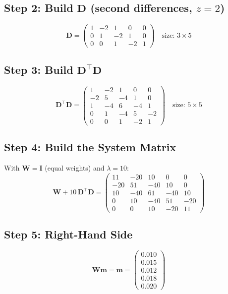 \documentclass[11pt,a4paper]{article}
\begin{document}
\subsection*{Step 2: Build $\bm{D}$ (second differences, $z=2$)}

\[
\bm{D} = \begin{pmatrix}
1 & -2 & 1 & 0 & 0 \\
0 & 1 & -2 & 1 & 0 \\
0 & 0 & 1 & -2 & 1
\end{pmatrix}
\quad\text{size: } 3 \times 5
\]

\subsection*{Step 3: Build $\bm{D}^\top\bm{D}$}

\[
\bm{D}^\top\bm{D} =
\begin{pmatrix}
 1 & -2 &  1 &  0 &  0 \\
-2 &  5 & -4 &  1 &  0 \\
 1 & -4 &  6 & -4 &  1 \\
 0 &  1 & -4 &  5 & -2 \\
 0 &  0 &  1 & -2 &  1
\end{pmatrix}
\quad\text{size: } 5 \times 5
\]

\subsection*{Step 4: Build the System Matrix}

With $\bm{W} = \bm{I}$ (equal weights) and $\lambda = 10$:
\[
\bm{W} + 10\,\bm{D}^\top\bm{D} =
\begin{pmatrix}
11 & -20 &  10 &   0 &  0 \\
-20 &  51 & -40 &  10 &  0 \\
 10 & -40 &  61 & -40 & 10 \\
  0 &  10 & -40 &  51 & -20 \\
  0 &   0 &  10 & -20 & 11
\end{pmatrix}
\]

\subsection*{Step 5: Right-Hand Side}

\[
\bm{W}\bm{m} = \bm{m} = \begin{pmatrix} 0.010 \\ 0.015 \\ 0.012 \\ 0.018 \\ 0.020 \end{pmatrix}
\]
\end{document}
